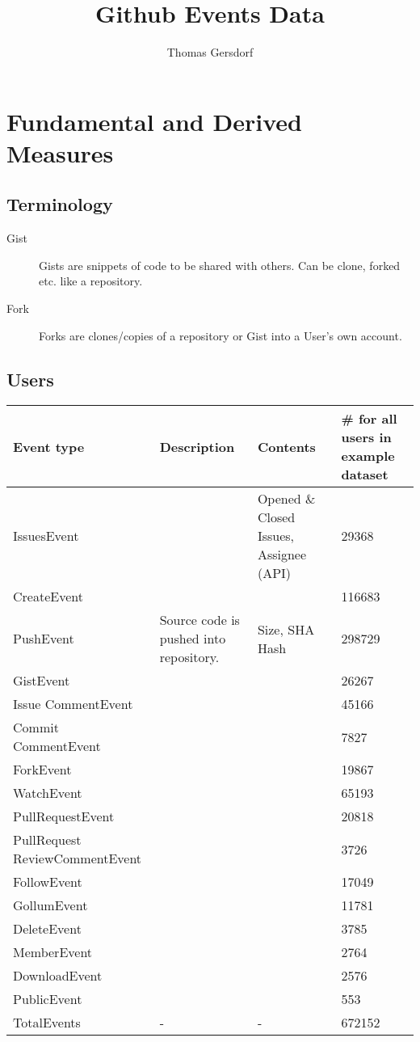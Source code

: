 \documentclass[a4paper,10pt]{article}
\title{Github Events Data}
\author{Thomas Gersdorf}
\begin{document}
\maketitle


\section{Fundamental and Derived Measures}
\subsection{Terminology}
\begin{description}
 \item[Gist] Gists are snippets of code to be shared with others. Can be clone, forked etc. like a repository.
\item [Fork] Forks are clones/copies of a repository or Gist into a User's own account.
\end{description}

\subsection{Users}

\begin{tabular}{|p{2.5cm}|p{4cm}|p{4cm}|p{2cm}|}\hline
\textbf{Event type} & \textbf{Description}&  \textbf{Contents}& \textbf{\#  for all users in example dataset} \\\hline
 IssuesEvent  &    &  Opened \& Closed Issues, Assignee (API) &29368\\\hline
CreateEvent    &    & &  116683\\\hline
PushEvent  & Source code is pushed into repository. &  Size, SHA Hash &  298729\\\hline
GistEvent   &    &   &  26267\\\hline
Issue
CommentEvent &    &    &   45166\\\hline
Commit
CommentEvent &    &    &  7827\\\hline
ForkEvent   &    &    & 19867\\\hline
WatchEvent  &  &    &   65193\\\hline
PullRequestEvent     &    &  &  20818\\\hline
PullRequest
ReviewCommentEvent  & && 3726\\\hline
FollowEvent   &    &  & 17049\\\hline
GollumEvent  &    &  &  11781\\\hline
DeleteEvent   &    &  &   3785\\\hline
MemberEvent   &    & &    2764\\\hline
DownloadEvent  &    & & 2576\\\hline
PublicEvent &  &    &  553\\\hline
TotalEvents & - & - & 672152 \\\hline

\end{tabular}
\end{document}
